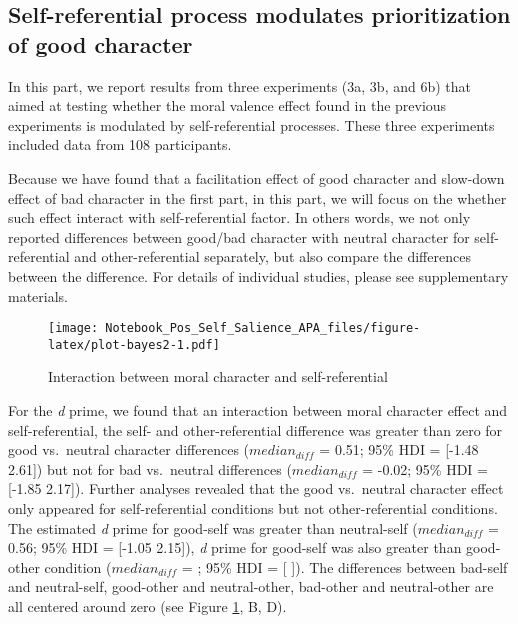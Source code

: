 \documentclass[
  man]{apa6}
\begin{document}
\hypertarget{self-referential-process-modulates-prioritization-of-good-character}{%
\subsection{Self-referential process modulates prioritization of good character}\label{self-referential-process-modulates-prioritization-of-good-character}}

In this part, we report results from three experiments (3a, 3b, and 6b) that aimed at testing whether the moral valence effect found in the previous experiments is modulated by self-referential processes. These three experiments included data from 108 participants.

Because we have found that a facilitation effect of good character and slow-down effect of bad character in the first part, in this part, we will focus on the whether such effect interact with self-referential factor. In others words, we not only reported differences between good/bad character with neutral character for self-referential and other-referential separately, but also compare the differences between the difference. For details of individual studies, please see supplementary materials.

\begin{figure}
\centering
\texttt{[image: Notebook\_Pos\_Self\_Salience\_APA\_files/figure-latex/plot-bayes2-1.pdf]}
\caption{\label{fig:plot-bayes2}Interaction between moral character and self-referential}
\end{figure}

For the \emph{d} prime, we found that an interaction between moral character effect and self-referential, the self- and other-referential difference was greater than zero for good vs.~neutral character differences (\(median_{diff}\) = 0.51; 95\% HDI = {[}-1.48 2.61{]}) but not for bad vs.~neutral differences (\(median_{diff}\) = -0.02; 95\% HDI = {[}-1.85 2.17{]}). Further analyses revealed that the good vs.~neutral character effect only appeared for self-referential conditions but not other-referential conditions. The estimated \emph{d} prime for good-self was greater than neutral-self (\(median_{diff}\) = 0.56; 95\% HDI = {[}-1.05 2.15{]}), \emph{d} prime for good-self was also greater than good-other condition (\(median_{diff}\) = ; 95\% HDI = {[} {]}). The differences between bad-self and neutral-self, good-other and neutral-other, bad-other and neutral-other are all centered around zero (see Figure \ref{fig:plot-bayes2}, B, D).
\end{document}
